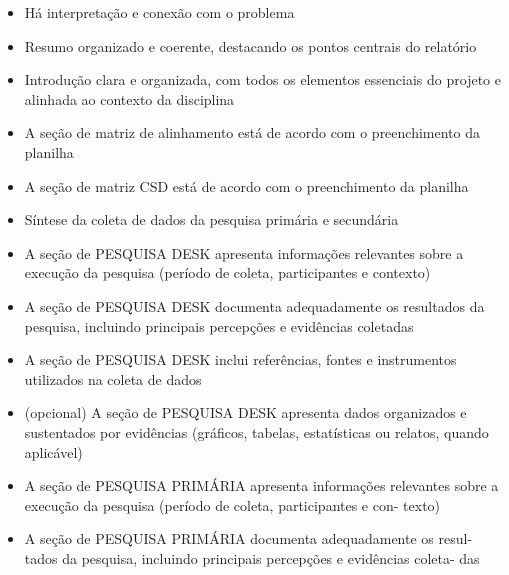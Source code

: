 \documentclass[
  sigconf,
  nonacm, %
  language=portuguese
]{acmart}
\begin{document}
\begin{itemize}[leftmargin=14pt,itemsep=1pt,topsep=3pt,parsep=0pt]
  \item[\textcolor{cgood}{$\checkmark$}] {\small\textcolor{cgood}{Há interpretação e conexão com o problema}}
  \item[\textcolor{cgood}{$\checkmark$}] {\small\textcolor{cgood}{Resumo organizado e coerente, destacando os pontos centrais do relatório}}
  \item[\textcolor{cgood}{$\checkmark$}] {\small\textcolor{cgood}{Introdução clara e organizada, com todos os elementos essenciais do projeto e alinhada ao contexto da disciplina}}
  \item[\textcolor{cgood}{$\checkmark$}] {\small\textcolor{cgood}{A seção de matriz de alinhamento está de acordo com o preenchimento da planilha}}
  \item[\textcolor{cgood}{$\checkmark$}] {\small\textcolor{cgood}{A seção de matriz CSD está de acordo com o preenchimento da planilha}}
  \item[\textcolor{cgood}{$\checkmark$}] {\small\textcolor{cgood}{Síntese da coleta de dados da pesquisa primária e secundária}}
  \item[\textcolor{cgood}{$\checkmark$}] {\small\textcolor{cgood}{A seção de PESQUISA DESK apresenta informações relevantes sobre a execução da pesquisa (período de coleta, participantes e contexto)}}
  \item[\textcolor{cgood}{$\checkmark$}] {\small\textcolor{cgood}{A seção de PESQUISA DESK documenta adequadamente os resultados da pesquisa, incluindo principais percepções e evidências coletadas}}
  \item[\textcolor{cgood}{$\checkmark$}] {\small\textcolor{cgood}{A seção de PESQUISA DESK inclui referências, fontes e instrumentos utilizados na coleta de dados}}
  \item[$\square$] {\small\textcolor{cmuted}{(opcional) A seção de PESQUISA DESK apresenta dados organizados e sustentados por evidências (gráficos, tabelas, estatísticas ou relatos, quando aplicável)}}
  \item[\textcolor{cgood}{$\checkmark$}] {\small\textcolor{cgood}{A seção de PESQUISA PRIMÁRIA apresenta informações relevantes  sobre a execução da pesquisa (período de coleta, participantes e con- texto)}}
  \item[\textcolor{cgood}{$\checkmark$}] {\small\textcolor{cgood}{A seção de PESQUISA PRIMÁRIA documenta adequadamente os resul- tados da pesquisa, incluindo principais percepções e evidências coleta- das}}

\end{itemize}
\end{document}
